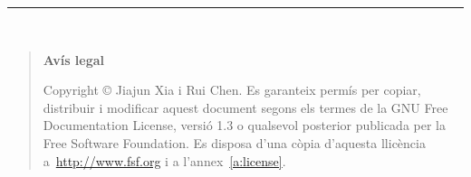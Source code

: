 
\newlength{\centeroffset}
\setlength{\centeroffset}{-0.5\oddsidemargin}
\addtolength{\centeroffset}{0.5\evensidemargin}
\thispagestyle{empty}
\noindent\hspace*{\centeroffset}

\begin{minipage}{\textwidth}
\vspace*{3truecm}


\noindent\rule[-1ex]{\textwidth}{5pt}\\[4.5ex]
\end{minipage}


\noindent\hspace*{\centeroffset}
\begin{minipage}{\textwidth}
\addtolength{\textwidth}{\centeroffset}
\end{minipage}


\pagebreak

\vspace*{16truecm}

	\begin{quote}
	\textbf{Avís legal}

	  Copyright \copyright{}  Jiajun Xia i Rui Chen.
	  Es garanteix permís per copiar, distribuir i modificar aquest document segons els termes de la GNU Free Documentation License, versió 1.3 o qualsevol posterior publicada per la Free Software Foundation. Es disposa d'una còpia d'aquesta llicència a~\href{http://www.fsf.org}{http://www.fsf.org} i a l'annex~\ref{a:license}.
	\end{quote}	





\endinput
